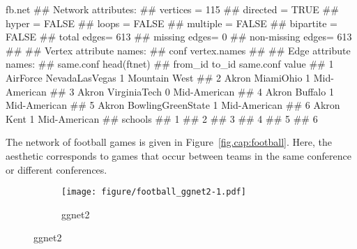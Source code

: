   
\begin{example}
fb.net 
##  Network attributes:
##   vertices = 115 
##   directed = TRUE 
##   hyper = FALSE 
##   loops = FALSE 
##   multiple = FALSE 
##   bipartite = FALSE 
##   total edges= 613 
##     missing edges= 0 
##     non-missing edges= 613 
## 
##  Vertex attribute names: 
##     conf vertex.names 
## 
##  Edge attribute names: 
##     same.conf
head(ftnet)
##    from_id             to_id same.conf         value
## 1 AirForce    NevadaLasVegas         1 Mountain West
## 2    Akron         MiamiOhio         1  Mid-American
## 3    Akron      VirginiaTech         0  Mid-American
## 4    Akron           Buffalo         1  Mid-American
## 5    Akron BowlingGreenState         1  Mid-American
## 6    Akron              Kent         1  Mid-American
##   schools
## 1        
## 2        
## 3        
## 4        
## 5        
## 6
\end{example}

The network of football games is given in Figure~\ref{fig.cap:football}. Here,  the  aesthetic  corresponds to games that occur between teams in the same conference or different conferences.  

\begin{figure}[hbtp]
\begin{subfigure}[t]{\textwidth}
\caption{ggnet2}\vspace{-.5cm}


             \begin{adjustbox}{valign=t}

             \begin{minipage}{.49\textwidth}
{\footnotesize
{} 
}
                   \end{minipage}

                  \begin{minipage}{.49\textwidth}

\texttt{[image: figure/football\_ggnet2-1.pdf]}

                          \end{minipage}

                          \end{adjustbox}
\end{subfigure}

\end{figure}

